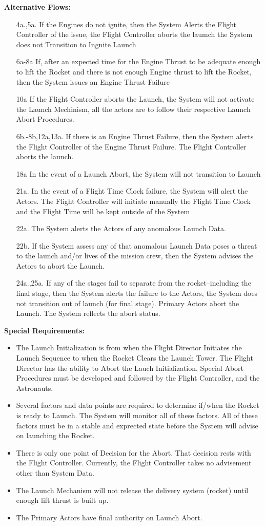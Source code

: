 \documentclass[letterpaper]{article}
\begin{document}
\textbf{Alternative Flows:}
\begin{itemize}
\item[4a.,5a.]If the Engines do not ignite, then the System Alerts the
Flight Controller of the issue, the Flight Controller aborts the
laumch the System does not Transition to Ingnite Launch
\item[6a-8a]If, after an expected time for the Engine Thrust to be
adequate enough to lift the Rocket and there is not enough Engine
thrust to lift the Rocket, then the System issues an Engine
Thrust Failure
\item[10a]If the Flight Controller aborts the Launch, the
System will not activate the Launch Mechinism, all the actors are to
follow their respective Launch Abort Procedures.
\item[6b.-8b,12a,13a.] If there is an Engine Thrust Failure, then the
System alerts the Flight Controller of the Engine Thrust Failure. The
Flight Controller aborts the launch.
\item[18a]In the event of a Launch Abort, the System will not
transition to Launch
\item[21a.] In the event of a Flight Time Clock failure, the System
will alert the Actors.  The Flight Controller will initiate manually the
Flight Time Clock and the Flight Time will be kept outside of the
System
\item[22a.]The System alerts the Actors of any anomalous Launch
Data.
\item[22b.]If the System assess any of that anomalous Launch Data poses
a threat to the launch and/or lives of the mission crew, then the
System advises the Actors to abort the Launch.
\item[24a.,25a.]If any of the stages fail to separate from the
rocket--including the final stage, then the System alerts the failure
to the Actors, the System does not transition out of launch (for final
stage).  Primary Actors abort the Launch.  The System reflects the
abort status.
\end{itemize}
\textbf{Special Requirements:}
\begin{itemize}
\item The Launch Initialization is from when the Flight Director
Initiates the Launch Sequence to when the Rocket Clears the Launch
Tower.  The Flight Director has the ability to Abort the Lauch
Initialization.  Special Abort Procedures must be developed and
followed by the Flight Controller, and the Astronauts.
\item Several factors and data points are required to determine
if/when the Rocket is ready to Launch.  The System will monitor all
of these factors.  All of these factors must be in a stable and
exprected state before the System will advise on launching the Rocket.
\item There is only one point of Decision for the Abort.  That decision
rests with the Flight Controller.  Currently, the Flight Controller
takes no advisement other than System Data.
\item The Launch Mechanism will not release the delivery system
(rocket) until enough lift thrust is built up.
\item The Primary Actors have final authority on Launch Abort.
\end{itemize}
\end{document}

